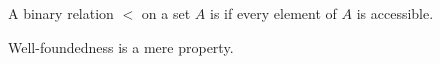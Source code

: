 \documentclass[hott-all.tex]{subfiles}
\begin{document}
% 
\begin{defn}
  A binary relation $<$ on a set $A$ is 
  if every element of $A$ is accessible.
\end{defn}
% 
% 
\begin{lem}
  Well-foundedness is a mere property.
\end{lem}
% 
\end{document}

